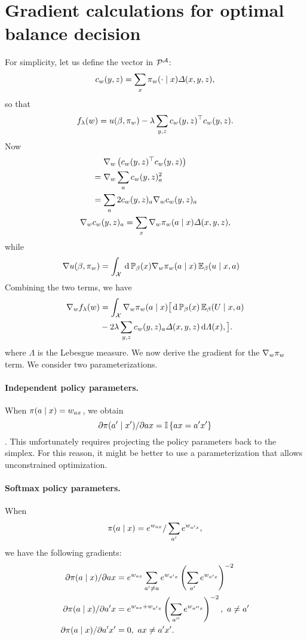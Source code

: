 \section{Gradient calculations for optimal balance decision}
\label{sec:gradient}

For simplicity, let us define the vector in ${\mathcal P}^{\mathcal{A}}$:
\[
c_w(y,z) = \sum_x \pi_w(\cdot \mid x) \Delta(x, y, z),
\]
so that
\[
f_\lambda(w) = u(\beta, \pi_w) -  \lambda \sum_{y,z} c_w(y,z)^\top c_w(y,z).
\]
Now
\begin{align*}
  &~~~~\nabla_w \left(c_w(y,z)^\top c_w(y,z)\right)
  \\
  &= 
  \nabla_w \sum_a c_w(y,z)_a^2\\
  &= 
  \sum_a 2 c_w(y,z)_a
  \nabla_w c_w(y, z)_a
  \\
  \nabla_w & c_w(y, z)_a
  = 
    \sum_x \nabla_w \pi_w(a \mid x) \Delta(x, y, z),
\end{align*}
while
\begin{align}
  \nabla u(\beta, \pi_w)
  &=
    \int_{\mathcal{X}} \,\mathrm{d} \mathop{\mbox{\ensuremath{\mathbb{P}}}}\nolimits_\beta(x) \nabla_w \pi_w(a \mid x) \mathop{\mbox{\ensuremath{\mathbb{E}}}}\nolimits_\beta (u \mid x, a) 
\end{align}
Combining the two terms, we have
\begin{align*}
  \nabla_w f_\lambda(w)
  &= 
    \int_{\mathcal{X}} \nabla_w \pi_w(a \mid x)
    \bigl[
    \,\mathrm{d} \mathop{\mbox{\ensuremath{\mathbb{P}}}}\nolimits_\beta(x) \mathop{\mbox{\ensuremath{\mathbb{E}}}}\nolimits_\beta(U \mid x, a)
  \\
  &- 2 \lambda \sum_{y,z} c_w(y, z)_a \Delta(x, y, z) \,\mathrm{d} \Lambda(x),
    \bigr].
\end{align*}
where $\Lambda$ is the Lebesgue measure.
We now derive the gradient for the $\nabla_w \pi_w$ term. We consider
two parameterizations.
\paragraph{Independent policy parameters.} When $\pi(a \mid x) = w_{ax}$, we obtain
$$\partial \pi(a' \mid x') / \partial ax = \mathop{\mbox{\ensuremath{\mathbb{I}}}}\left\{ax = a'x'\right\}$$.
This unfortunately requires projecting the policy parameters back to  the simplex. For this reason, it might be better to use a parameterization that allows unconstrained optimization. 
\paragraph{Softmax policy parameters.} When 
$$\pi(a \mid x) = e^{w_{ax}} / \sum_{a'} e^{w_{a'x}},$$
we have the following gradients:
\begin{align*}
  \partial \pi(a \mid x) / \partial ax
  &= 
    e^{w_{ax}} \sum_{a' \neq a} e^{w_{a'x}} \left(\sum_{a'} e^{w_{a'x}}\right)^{-2}
  \\
  \partial \pi(a \mid x) / \partial a'x
  &= 
    e^{w_{ax} + w_{a'x}}\left(\sum_{a''} e^{w_{a''x}}\right)^{-2}, ~ a \neq a'\\
  \partial \pi(a \mid x) / \partial a'x'
  &= 
    0, ~ ax \neq a'x'.
\end{align*}


